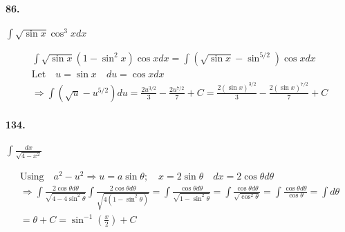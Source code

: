     \paragraph*{86.}
    $\int \sqrt{\sin x}\cos^3 x dx$
    \\
    \begin{mdframed}
        \begin{equation*}
            \begin{gathered}      
                \int \sqrt{\sin x}(1-\sin^2 x )\cos x dx
                = \int (\sqrt{\sin x} - \sin^{5/2})\cos x dx                        \\
                \text{Let} \quad u = \sin x \quad du = \cos x dx                    \\
                \Rightarrow \int \left(\sqrt{u} - u^{5/2}\right)du
                = \frac{2u^{3/2}}{3} - \frac{2u^{7/2}}{7} + C
                = \boxed{\frac{2(\sin x)^{3/2}}{3} - \frac{2(\sin x)^{7/2}}{7} + C}
            \end{gathered}
        \end{equation*}
    \end{mdframed}

    \paragraph*{134.}
    $\int \frac{dx}{\sqrt{4-x^2}}$
    \\
    \begin{mdframed}
        \begin{equation*}
            \begin{gathered}
                \text{Using} \quad a^2 - u^2 \Rightarrow  
                u = a\sin\theta; \quad x = 2\sin\theta 
                \quad dx = 2\cos\theta d\theta                                      \\
                \Rightarrow\int \frac{2\cos\theta d \theta}{\sqrt{4-4\sin^2\theta}}    
                \int \frac{2\cos\theta d \theta}{\sqrt{4(1-\sin^2\theta)}}
                = \int \frac{\cos\theta d \theta}{\sqrt{1-\sin^2\theta}}    
                = \int \frac{\cos\theta d \theta}{\sqrt{\cos^2\theta}}      
                = \int \frac{\cos\theta d \theta}{\cos\theta} = \int d\theta        \\
                = \theta + C = \boxed{\sin^{-1}\left(\frac{x}{2}\right) + C} 
            \end{gathered}
        \end{equation*}    
    \end{mdframed}


